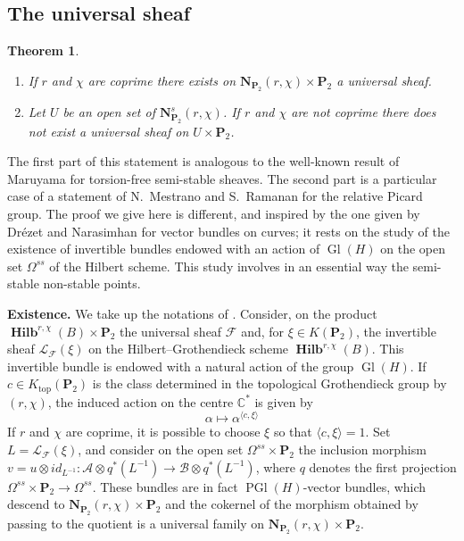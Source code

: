 \documentclass[12pt,english]{smfart}%
\theoremstyle{plain}
\newtheorem{theorem}{Theorem}[section]
\theoremstyle{definition}
\theoremstyle{remark}
\newcommand{\PP}{\mathbf{P}}
\newcommand{\CC}{\mathbb{C}}
\DeclareMathOperator{\Gl}{Gl}
\DeclareMathOperator{\PGl}{PGl}
\DeclareMathOperator{\Hilb}{\mathbf{Hilb}}
\begin{document}
\subsection{The universal sheaf}\label{subsec:universal}

\begin{theorem}\label{thm:univ}
\begin{enumerate}
\item If $r$ and $\chi$ are coprime there exists on $\mathbf{N}_{\PP_{2}}(r,\chi)\times\PP_{2}$ a universal sheaf.
\item Let $U$ be an open set of $\mathbf{N}^{s}_{\PP_{2}}(r,\chi)$. If $r$ and $\chi$ are not coprime there does not exist a universal sheaf on $U\times\PP_{2}$.
\end{enumerate}
\end{theorem}

The first part of this statement is analogous to the well-known result of Maruyama for torsion-free semi-stable sheaves. The second part is a particular case of a statement of N.~Mestrano and S.~Ramanan \cite{Mes} for the relative Picard group. The proof we give here is different, and inspired by the one given by Dr\'ezet and Narasimhan \cite{Dre3} for vector bundles on curves; it rests on the study of the existence of invertible bundles endowed with an action of $\Gl(H)$ on the open set $\Omega^{ss}$ of the Hilbert scheme. This study involves in an essential way the semi-stable non-stable points.

\medskip
\noindent\textbf{Existence.} We take up the notations of . Consider, on the product $\Hilb^{r,\chi}(B)\times\PP_{2}$ the universal sheaf $\mathscr{F}$ and, for $\xi\in K(\PP_{2})$, the invertible sheaf $\mathscr{L}_{\mathscr{F}}(\xi)$ on the Hilbert--Grothendieck scheme $\Hilb^{r,\chi}(B)$. This invertible bundle is endowed with a natural action of the group $\Gl(H)$. If $c\in K_{\mathrm{top}}(\PP_{2})$ is the class determined in the topological Grothendieck group by $(r,\chi)$, the induced action on the centre $\CC^{*}$ is given by
\[
\alpha \longmapsto \alpha^{\langle c,\xi\rangle}
\]
If $r$ and $\chi$ are coprime, it is possible to choose $\xi$ so that $\langle c,\xi\rangle=1$. Set $L=\mathscr{L}_{\mathscr{F}}(\xi)$, and consider on the open set $\Omega^{ss}\times\PP_{2}$ the inclusion morphism $v=u\otimes id_{L^{-1}}:\mathscr{A}\otimes q^{*}(L^{-1})\to\mathscr{B}\otimes q^{*}(L^{-1})$, where $q$ denotes the first projection $\Omega^{ss}\times\PP_{2}\to\Omega^{ss}$. These bundles are in fact $\PGl(H)$-vector bundles, which descend to $\mathbf{N}_{\PP_{2}}(r,\chi)\times\PP_{2}$ and the cokernel of the morphism obtained by passing to the quotient is a universal family on $\mathbf{N}_{\PP_{2}}(r,\chi)\times\PP_{2}$.
\end{document}
